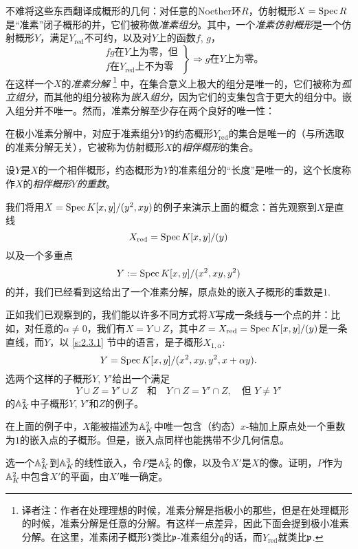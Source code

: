 不难将这些东西翻译成概形的几何：对任意的Noether环$R$，仿射概形$X=\operatorname{Spec} R$是“准素”闭子概形的并，它们被称做\textit{准素组分}。其中，一个\textit{准素仿射概形}是一个仿射概形$Y$，满足$Y_{\text{red}}$不可约，以及对$Y$上的函数$f$, $g$，
\[
	\left. 
		\begin{aligned}
			&\text{$fg$在$Y$上为零，但}\\
			&\text{$f$在$Y_{\text{red}}$上不为零}
		\end{aligned}
	\right\} \Rightarrow \text{$g$在$Y$上为零。}
\]
在这样一个$X$的\textit{准素分解}
\footnote{译者注：作者在处理理想的时候，准素分解是指极小的那些，但是在处理概形的时候，准素分解是任意的分解。有这样一点差异，因此下面会提到极小准素分解。在这里，准素闭子概形$Y$类比$\mathfrak{p}$-准素组分$\mathfrak{q}$的话，而$Y_{\text{red}}$就类比$\mathfrak{p}$.}
中，在集合意义上极大的组分是唯一的，它们被称为\textit{孤立组分}，而其他的组分被称为\textit{嵌入组分}，因为它们的支集包含于更大的组分中。嵌入组分并不唯一。然而，准素分解至少存在两个良好的唯一性：
\begin{compactenum}[(1)]
\item 在极小准素分解中，对应于准素组分$Y$的约态概形$Y_{\text{red}}$的集合是唯一的（与所选取的准素分解无关），它被称为仿射概形$X$的\textit{相伴概形}的集合。
\item 设$Y$是$X$的一个相伴概形，约态概形为$Y$的准素组分的“长度”是唯一的，这个长度称作$X$的\textit{相伴概形$Y$的重数}。
\end{compactenum}

我们将用$X=\operatorname{Spec} K[x,y]/(y^2,xy)$的例子来演示上面的概念：首先观察到$X$是直线
\[
	X_{\text{red}}=\operatorname{Spec} K[x,y]/(y)
\]
以及一个多重点
\[
	Y:=\operatorname{Spec} K[x,y]/(x^2,xy,y^2)
\]
的并，我们已经看到这给出了一个准素分解，原点处的嵌入子概形的重数是$1$.

正如我们已观察到的，我们能以许多不同方式将$X$写成一条线与一个点的并：比如，对任意的$\alpha\neq 0$，我们有$X=Y\cup Z$，其中$Z=X_{\text{red}}=\operatorname{Spec} K[x,y]/(y)$是一条直线，而$Y$，以 \ref{s:2.3.1} 节中的语言，是子概形$X_{1,\alpha}$:
\[
	Y=\operatorname{Spec} K[x,y]/(x^2,xy,y^2,x+\alpha y).
\]
选两个这样的子概形$Y$, $Y'$给出一个满足
\[
	Y\cup Z=Y'\cup Z\quad \text{和}\quad Y\cap Z=Y'\cap Z,\quad \text{但}\,\,Y\neq Y'
\]\label{p:69}
的$\mathbb{A}_K^2$中子概形$Y$, $Y'$和$Z$的例子。

在上面的例子中，$X$能被描述为$\mathbb{A}_K^2$中唯一包含（约态）$x$-轴加上原点处一个重数为$1$的嵌入点的子概形。但是，嵌入点同样也能携带不少几何信息。

\begin{exe}
	选一个$\mathbb{A}_K^2$到$\mathbb{A}^3_K$的线性嵌入，令$P$是$\mathbb{A}_K^2$的像，以及令$X'$是$X$的像。证明，$P$作为$\mathbb{A}_K^2$中包含$X'$的平面，由$X'$唯一确定。
\end{exe}

